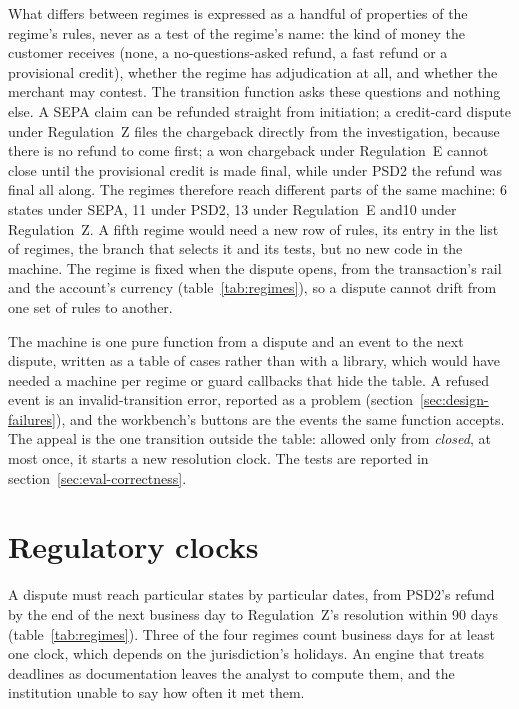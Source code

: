 What differs between regimes is expressed as a handful of properties of the regime's rules, never as a test
of the regime's name: the kind of money the customer receives (none, a no-questions-asked refund, a fast refund
or a provisional credit), whether the regime has adjudication at all, and whether the merchant may contest. The
transition function asks these questions and nothing else. A SEPA claim can be refunded straight from
initiation; a credit-card dispute under Regulation~Z files the chargeback directly from the investigation,
because there is no refund to come first; a won chargeback under Regulation~E cannot close until the
provisional credit is made final, while under PSD2 the refund was final all along. The regimes therefore reach
different parts of the same machine: 6 states under SEPA, 11 under PSD2, 13 under Regulation~E and10 under Regulation~Z. A fifth regime would need a new row of rules, its entry in the list of regimes, the
branch that selects it and its tests, but no new code in the machine. The regime is fixed when the dispute
opens, from the transaction's rail and the account's currency (table~\ref{tab:regimes}), so a dispute cannot
drift from one set of rules to another.

The machine is one pure function from a dispute and an event to the next dispute, written as a table of cases
rather than with a library, which would have needed a machine per regime or guard callbacks that hide the table.
A refused event is an invalid-transition error, reported as a  problem (section~\ref{sec:design-failures}),
and the workbench's buttons are the events the same function accepts. The appeal is the one transition outside the
table: allowed only from \emph{closed}, at most once, it starts a new resolution clock. The tests are reported in
section~\ref{sec:eval-correctness}.

\section{Regulatory clocks}
\label{sec:design-clocks}

A dispute must reach particular states by particular dates, from PSD2's refund by the end of the next business
day \cite[art.~73(1)]{psd2} to Regulation~Z's resolution within 90 days \cite[\S~1026.13(c)]{regz}
(table~\ref{tab:regimes}). Three of the four regimes count business days for at least one clock, which depends on
the jurisdiction's holidays. An engine that treats deadlines as documentation leaves the analyst to compute them,
and the institution unable to say how often it met them.

